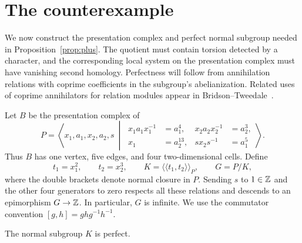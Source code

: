 \section{The counterexample}\label{sec:construction}

We now construct the presentation complex and perfect normal subgroup
needed in Proposition~\ref{prop:plus}. The quotient must contain torsion
detected by a character, and the corresponding local system on the
presentation complex must have vanishing second homology.
Perfectness will follow from
annihilation relations with coprime coefficients in the subgroup's
abelianization.
Related uses of coprime annihilators for relation modules appear in
Bridson--Tweedale~\cite[Proposition~3.3]{BridsonTweedale07}.

Let $B$ be the presentation complex of
\begin{equation}\label{eq:presentation}
 P=\left\langle x_1,a_1,x_2,a_2,s\ \middle|\
 \begin{aligned}
 x_1a_1x_1^{-1}&=a_1^4,&
 x_2a_2x_2^{-1}&=a_2^3,\\
 x_1&=a_2^{13},&
 s x_2 s^{-1}&=a_1^5
 \end{aligned}\right\rangle.
\end{equation}
Thus $B$ has one vertex, five edges, and four two-dimensional cells.
Define
\[
 t_1=x_1^2,\qquad t_2=x_2^3,\qquad
 K=\langle\!\langle t_1,t_2\rangle\!\rangle_P,
 \qquad G=P/K,
\]
where the double brackets denote normal closure in $P$.
Sending $s$ to $1\in\mathbb Z$ and the other four generators to zero
respects all these relations and descends to an epimorphism
$G\to\mathbb Z$. In particular, $G$ is infinite.
We use the commutator convention $[g,h]=ghg^{-1}h^{-1}$.

\begin{lemma}\label{lem:perfect}
The normal subgroup $K$ is perfect.
\end{lemma}


